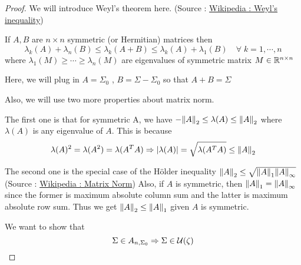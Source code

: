 \begin{proof}
    We will introduce Weyl's theorem here. (Source : \href{https://en.wikipedia.org/wiki/Weyl%27s_inequality}{Wikipedia : Weyl's inequality})

    If $A, B$ are $n\times n$ symmetric (or Hermitian) matrices then \[\lambda_k(A) + \lambda_n(B) \leq \lambda_k(A+B) \leq \lambda_k(A) +\lambda_1(B)\quad \forall\; k=1, \cdots, n\] where $\lambda_1(M)\geq \cdots \geq \lambda_n(M)$ are eigenvalues of symmetric matrix $M\in \mathbb R^{n\times n}$

    Here, we will plug in $A= \Sigma_0$ , $B= \Sigma - \Sigma_0$ so that $A+B = \Sigma$ 

    Also, we will use two more properties about matrix norm. 

    The first one is that for symmetric A, we have $-\norm{A}_2 \leq \lambda(A)\leq \norm{A}_2$ where $\lambda(A)$ is any eigenvalue of $A$. This is because \[\lambda(A)^2 = \lambda(A^2) = \lambda(A^T A) \Rightarrow \abs{\lambda(A)} = \sqrt{\lambda(A^T A)}\leq \norm{A}_2 \]

    The second one is the special case of the H\"{o}lder inequality $\norm{A}_2 \leq \sqrt{\norm{A}_1\norm{A}_\infty}$ (Source : \href{https://en.wikipedia.org/wiki/Matrix_norm}{Wikipedia : Matrix Norm}) Also, if $A$ is symmetric, then $\norm{A}_1 = \norm{A}_\infty$ since the former is maximum absolute column sum and the latter is maximum absolute row sum. Thus we get $\norm{A}_2 \leq \norm{A}_1$ given $A$ is symmetric.

    We want to show that \[\Sigma \in A_{n, \Sigma_0} \Rightarrow \Sigma \in \mathcal{U}(\zeta)\]


\end{proof}
